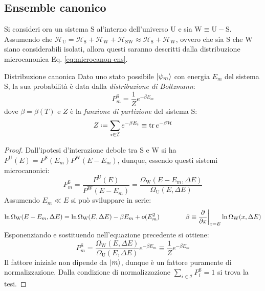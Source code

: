 \subsection{Ensemble canonico}

Si consideri ora un sistema $ \text{S} $ al'interno dell'universo $ \text{U} $ e sia $ \text{W} \equiv \text{U} - \text{S} $. Assumendo che $ \mathcal{H}_\text{U} = \mathcal{H}_\text{S} + \mathcal{H}_\text{W} + \mathcal{H}_\text{SW} \approx \mathcal{H}_\text{S} + \mathcal{H}_\text{W} $, ovvero che sia $ \text{S} $ che $ \text{W} $ siano considerabili isolati, allora questi saranno descritti dalla distribuzione microcanonica Eq. \ref{eq:microcanon-ens}.

\begin{theorem}{Distribuzione canonica}{}
	Dato uno stato possibile $ \ket{\psi_m} $ con energia $ E_m $ del sistema $ \text{S} $, la sua probabilità è data dalla \textit{distribuzione di Boltzmann}:
	\begin{equation}
		P_m^\text{S} = \frac{1}{Z} e^{- \beta E_m}
	\end{equation}
	dove $ \beta = \beta(T) $ e $ Z $ è la \textit{funzione di partizione} del sistema $ \text{S} $:
	\begin{equation}
		Z \defeq \sum_{i \in \mathcal{I}} e^{- \beta E_i} \equiv \tr e^{- \beta \mathcal{H}}
		\label{eq:part-func-states}
	\end{equation}

	\tcblower

	\begin{proof}
		Dall'ipotesi d'interazione debole tra $ \text{S} $ e $ \text{W} $ si ha $ P^\text{U}(E) = P^\text{S}(E_m) P^\text{W}(E - E_m) $, dunque, essendo questi sistemi microcanonici:
		\begin{equation*}
			P_m^\text{S} = \frac{P^\text{U}(E)}{P^\text{W}(E-E_m)} = \frac{\Omega_\text{W}(E-E_m,\Delta E)}{\Omega_\text{U}(E,\Delta E)}
		\end{equation*}
		Assumendo $ E_m \ll E $ si può sviluppare in serie:
		\begin{equation*}
			\ln \Omega_\text{W}(E - E_m , \Delta E) = \ln \Omega_\text{W}(E , \Delta E) - \beta E_m + o(E_m^2)
			\qquad \qquad
			\beta \equiv \frac{\partial}{\partial x}\bigg\vert_{x = E} \ln \Omega_\text{W}(x , \Delta E)
		\end{equation*}
		Esponenziando e sostituendo nell'equazione precedente si ottiene:
		\begin{equation*}
			P_m^\text{S} = \frac{\Omega_\text{W}(E , \Delta E)}{\Omega_\text{U}(E, \Delta E)} e^{- \beta E_m} \equiv \frac{1}{Z} e^{- \beta E_m}
		\end{equation*}
		Il fattore iniziale non dipende da $ \ket{m} $, dunque è un fattore puramente di normalizzazione. Dalla condizione di normalizzazione $ \sum_{i \in \mathcal{I}} P_i^\text{S} = 1 $ si trova la tesi.
	\end{proof}
\end{theorem}

